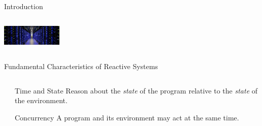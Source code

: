 \documentclass{beamer}
\begin{document}
\begin{frame}{Introduction\cite{manna1992temporal}}
\begin{columns}
\begin{column}{.3\textwidth}
\begin{center}
        \vspace*{12pt}

        \includegraphics[height=1cm]{servers.jpg}
      \end{center}

    \end{column}
  \end{columns}

\end{frame}

\begin{frame}{Fundamental Characteristics of Reactive Systems}

  \begin{columns}
    \begin{column}{.5\textwidth}
  \centering

    \end{column}
    \begin{column}{.5\textwidth}

      {
        \begin{block}{Time and State}
          Reason about the \emph{state} of the program relative to the \emph{state} of the environment.
        \end{block}

        \begin{block}{Concurrency}
          A program and its environment may act at the same time.
        \end{block}

}
\end{column}
\end{columns}
\end{frame}
\end{document}
